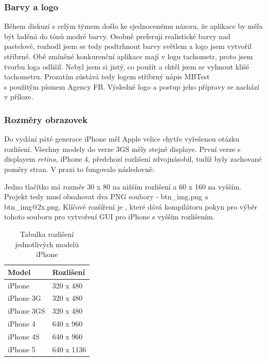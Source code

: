 \subsubsection*{Barvy a logo}
Během diskuzí s celým týmem došlo ke sjednocenému názoru, že aplikace by měla být laděná do tónů modré barvy. Osobně preferuji realistické barvy nad pastelové, rozhodl jsem se tedy podtrhnout barvy světlem a logo jsem vytvořil stříbrné. Obě zmíněné konkurenční aplikace mají v logu tachometr, proto jsem tvorbu loga odlišil. Nebyl jsem si jistý, co použít a chtěl jsem se vyhnout klišé tachometru. Prozatím zůstává tedy logem stříbrný nápis MBTest \\s použitým písmem Agency FB. Výsledné logo a postup jeho přípravy se nachází v příloze.

\subsubsection*{Rozměry obrazovek}
Do vydání páté generace iPhone měl Apple velice chytře vyřešenou otázku rozlišení. Všechny modely do verze 3GS měly stejné displaye. První verze s displayem \emph{retina}, iPhone 4, předchozí rozlišení zdvojnásobil, tudíž byly zachované poměry stran. V praxi to fungovalo následovně:

Jedno tlačítko má rozměr 30 x 80 na nižším rozlišení a 60 x 160 na vyšším. Projekt tedy musí obsahovat dva PNG soubory - btn\_img.png a btn\_img@2x.png. Klíčové rozšíření je , které dává kompilátoru pokyn pro výběr tohoto souboru pro vytvoření GUI pro iPhone s vyšším rozlišením.

\begin{table}[h]
	\begin{center}
		\begin{tabular}{|l|l|}
			\hline
				{\bf Model} & {\bf Rozlišení}\\
			\hline \hline
				iPhone & 320 x 480\\
				\hline
				iPhone 3G & 320 x 480\\
				\hline
				iPhone 3GS & 320 x 480\\
				\hline
				iPhone 4 & 640 x 960\\
				\hline
				iPhone 4S & 640 x 960\\
				\hline
				iPhone 5 & 640 x 1136\\
				\hline
		\end{tabular}
	\end{center}
	\caption{Tabulka rozlišení jednotlivých modelů iPhone}
	\label{tab.resphone}
\end{table}

